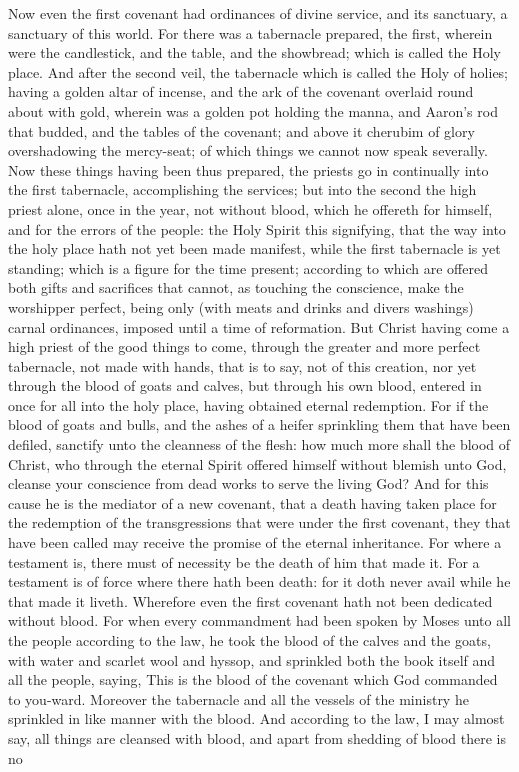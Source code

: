 Now even the first covenant had ordinances of divine service, and its sanctuary, a sanctuary of this world. For there was a tabernacle prepared, the first, wherein were the candlestick, and the table, and the showbread; which is called the Holy place. And after the second veil, the tabernacle which is called the Holy of holies; having a golden altar of incense, and the ark of the covenant overlaid round about with gold, wherein was a golden pot holding the manna, and Aaron’s rod that budded, and the tables of the covenant; and above it cherubim of glory overshadowing the mercy-seat; of which things we cannot now speak severally. Now these things having been thus prepared, the priests go in continually into the first tabernacle, accomplishing the services; but into the second the high priest alone, once in the year, not without blood, which he offereth for himself, and for the errors of the people: the Holy Spirit this signifying, that the way into the holy place hath not yet been made manifest, while the first tabernacle is yet standing; which is a figure for the time present; according to which are offered both gifts and sacrifices that cannot, as touching the conscience, make the worshipper perfect, being only (with meats and drinks and divers washings) carnal ordinances, imposed until a time of reformation.  But Christ having come a high priest of the good things to come, through the greater and more perfect tabernacle, not made with hands, that is to say, not of this creation, nor yet through the blood of goats and calves, but through his own blood, entered in once for all into the holy place, having obtained eternal redemption. For if the blood of goats and bulls, and the ashes of a heifer sprinkling them that have been defiled, sanctify unto the cleanness of the flesh: how much more shall the blood of Christ, who through the eternal Spirit offered himself without blemish unto God, cleanse your conscience from dead works to serve the living God? And for this cause he is the mediator of a new covenant, that a death having taken place for the redemption of the transgressions that were under the first covenant, they that have been called may receive the promise of the eternal inheritance. For where a testament is, there must of necessity be the death of him that made it. For a testament is of force where there hath been death: for it doth never avail while he that made it liveth. Wherefore even the first covenant hath not been dedicated without blood. For when every commandment had been spoken by Moses unto all the people according to the law, he took the blood of the calves and the goats, with water and scarlet wool and hyssop, and sprinkled both the book itself and all the people, saying, This is the blood of the covenant which God commanded to you-ward. Moreover the tabernacle and all the vessels of the ministry he sprinkled in like manner with the blood. And according to the law, I may almost say, all things are cleansed with blood, and apart from shedding of blood there is no 